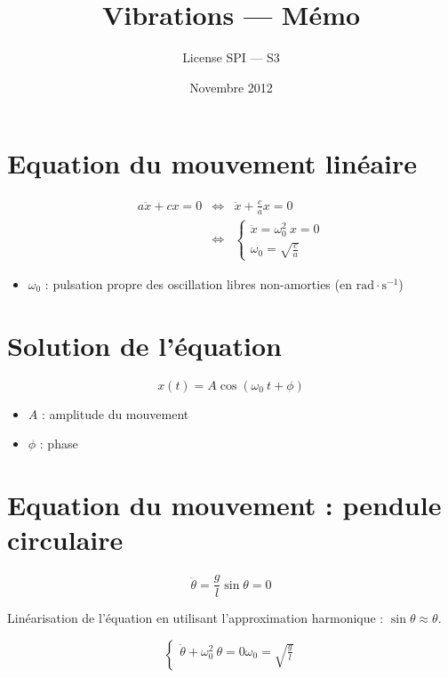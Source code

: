 \documentclass[a4paper, 11pt]{article}
\title{Vibrations — Mémo}
\author{License SPI — S3}
\date{Novembre 2012}
\begin{document}
    \maketitle

\section{Equation du mouvement linéaire}

\begin{eqnarray*}
    a\ddot{x} + cx = 0 & \Leftrightarrow & \ddot{x} + \frac{c}{a}x = 0\\
                       & \Leftrightarrow & \left\{
    \begin{array}{l}
        \ddot{x} = \omega_0^2~x = 0\\
        \omega_0 = \sqrt{\frac{c}{a}}
    \end{array}
\right.  \end{eqnarray*}

\begin{itemize}
    \item $\omega_0$ : pulsation propre des oscillation libres non-amorties (en $\mathrm{rad}\cdot\mathrm{s}^{-1}$)
\end{itemize}

\section{Solution de l'équation}

$$x(t) = A\cos(\omega_0~t + \phi)$$

\begin{itemize}
    \item $A$ : amplitude du mouvement
    \item $\phi$ : phase
\end{itemize}

\section{Equation du mouvement : pendule circulaire}

$$\ddot{\theta} = \frac{g}{l}\sin\theta = 0$$

Linéarisation de l'équation en utilisant l'approximation harmonique : $\sin\theta\approx\theta$.

\[
    \left\{
    \begin{array}{l}
        \ddot{\theta} + \omega_0^2~\theta = 0
        \omega_0 = \sqrt{\frac{g}{l}}
    \end{array}
    \right.
\]
\end{document}
